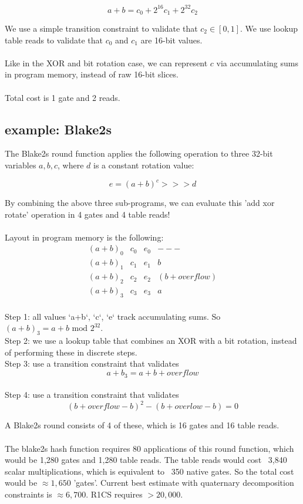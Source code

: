 \documentclass[11pt]{article} %
\begin{document}
$$a + b = c_0 + 2^{16}c_1 + 2^{32}c_2$$

We use a simple transition constraint to validate that $c_2 \in [0, 1]$. We use lookup table reads to validate that $c_0$ and $c_1$ are 16-bit values.
\\
\\
Like in the XOR and bit rotation case, we can represent $c$ via accumulating sums in program memory, instead of raw 16-bit slices.
\\
\\
Total cost is 1 gate and 2 reads.

\subsection{example: Blake2s}

The Blake2s round function applies the following operation to three 32-bit variables $a, b, c$, where $d$ is a constant rotation value:

$$
e = (a + b) ^ c >>> d
$$

By combining the above three sub-programs, we can evaluate this 'add xor rotate' operation in 4 gates and 4 table reads!
\\
\\
Layout in program memory is the following:
$$
\begin{array}{|c|c|c|c|}
(a+b)_0 & c_0 & e_0 & --- \\
(a+b)_1 & c_1 & e_1 & b \\
(a+b)_2 & c_2 & e_2 & (b + overflow) \\
(a+b)_3 & c_3 & e_3 & a \\
\end{array}
$$

Step 1: all values `a+b`, `c`, `e` track accumulating sums. So ${(a+b)}_3 = a + b \text{ mod } 2^{32}$.
\\
Step 2: we use a lookup table that combines an XOR with a bit rotation, instead of performing these in discrete steps.
\\
Step 3: use a transition constraint that validates
$$
{a+b}_3 = a + {b + overflow}
$$
\\
Step 4: use a transition constraint that validates 
$$
({b + overflow} - b)^2 - ({b + overlow} - b) = 0
$$

A Blake2s round consists of 4 of these, which is 16 gates and 16 table reads. 
\\
\\
The blake2s hash function requires 80 applications of this round function, which would be 1,280 gates and 1,280 table reads. The table reads would cost ~3,840 scalar multiplications, which is equivalent to ~350 native gates. So the total cost would be $\approx1,650$ 'gates'. Current best estimate with quaternary decomposition constraints is $\approx6,700$. R1CS requires $>20,000$.
\end{document}
